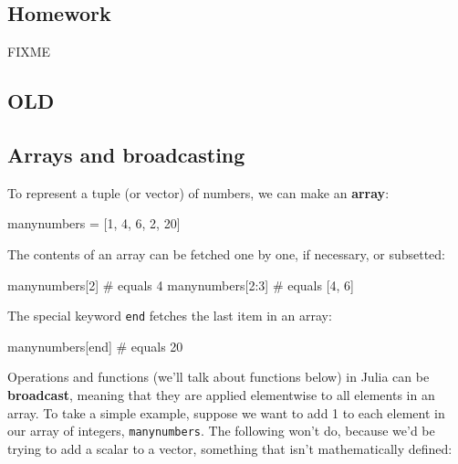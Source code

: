 \documentclass[
  letterpaper,
  DIV=11,
  numbers=noendperiod]{scrartcl}
\newenvironment{Shaded}{\begin{snugshade}}{\end{snugshade}}
\newcommand{\CommentTok}[1]{\textcolor[rgb]{0.37,0.37,0.37}{#1}}
\newcommand{\FloatTok}[1]{\textcolor[rgb]{0.68,0.00,0.00}{#1}}
\newcommand{\KeywordTok}[1]{\textcolor[rgb]{0.00,0.23,0.31}{#1}}
\newcommand{\NormalTok}[1]{\textcolor[rgb]{0.00,0.23,0.31}{#1}}
\newcommand{\OperatorTok}[1]{\textcolor[rgb]{0.37,0.37,0.37}{#1}}
\begin{document}
\subsection{Homework}\label{homework}

FIXME

\subsection{OLD}\label{old}

\subsection{Arrays and broadcasting}\label{arrays-and-broadcasting}

To represent a tuple (or vector) of numbers, we can make an
\textbf{array}:

\begin{Shaded}
\begin{Highlighting}[]
\NormalTok{manynumbers }\OperatorTok{=}\NormalTok{ [}\FloatTok{1}\NormalTok{, }\FloatTok{4}\NormalTok{, }\FloatTok{6}\NormalTok{, }\FloatTok{2}\NormalTok{, }\FloatTok{20}\NormalTok{]}
\end{Highlighting}
\end{Shaded}

The contents of an array can be fetched one by one, if necessary, or
subsetted:

\begin{Shaded}
\begin{Highlighting}[]
\NormalTok{manynumbers[}\FloatTok{2}\NormalTok{] }\CommentTok{\# equals 4}
\NormalTok{manynumbers[}\FloatTok{2}\OperatorTok{:}\FloatTok{3}\NormalTok{] }\CommentTok{\# equals [4, 6]}
\end{Highlighting}
\end{Shaded}

The special keyword \texttt{end} fetches the last item in an array:

\begin{Shaded}
\begin{Highlighting}[]
\NormalTok{manynumbers[}\KeywordTok{end}\NormalTok{] }\CommentTok{\# equals 20}
\end{Highlighting}
\end{Shaded}

Operations and functions (we'll talk about functions below) in Julia can
be \textbf{broadcast}, meaning that they are applied elementwise to all
elements in an array. To take a simple example, suppose we want to add 1
to each element in our array of integers, \texttt{manynumbers}. The
following won't do, because we'd be trying to add a scalar to a vector,
something that isn't mathematically defined:
\end{document}
